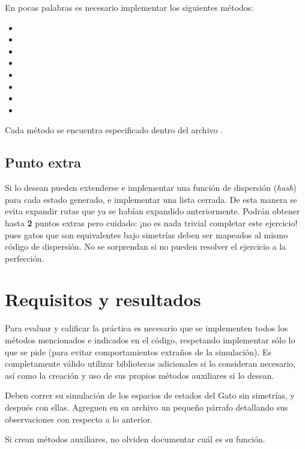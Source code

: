 \noindent En pocas palabras es necesario implementar los siguientes métodos:

\begin{itemize}
  \item {}
  \item {}
  \item {}
  \item {}
  \item {}
  \item {}
  \item {}
  \item {}
\end{itemize}

\noindent Cada método se encuentra especificado dentro del archivo .


\subsection{Punto extra}
Si lo desean pueden extenderse e implementar una función de dispersión (\textit{hash}) para cada estado generado, e implementar una lista cerrada. De esta manera se evita expandir rutas que ya se habían expandido anteriormente. Podrán obtener hasta \textbf{2} puntos extras pero cuidado: ¡no es nada trivial completar este ejercicio! pues gatos que son equivalentes bajo simetrías deben ser mapeados al mismo código de dispersión.  No se sorprendan si no pueden resolver el ejercicio a la perfección.


\section{Requisitos y resultados}

Para evaluar y calificar la práctica es necesario que se implementen todos los métodos mencionados e indicados en el código, respetando implementar sólo lo que se pide (para evitar comportamientos extraños de la simulación).
Es completamente válido utilizar bibliotecas adicionales si lo consideran necesario, así como la creación y uso de sus propios métodos auxiliares si lo desean.

Deben correr su simulación de los espacios de estados del Gato sin simetrías, y después con ellas. Agreguen en su archivo  un pequeño párrafo detallando sus observaciones con respecto a lo anterior.

Si crean métodos auxiliares, no olviden documentar cuál es su función.

